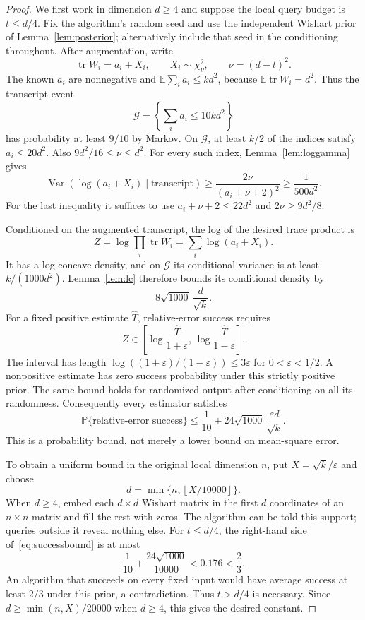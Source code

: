 \documentclass[11pt]{article}
\theoremstyle{definition}\newtheorem{definition}[theorem]{Definition}
\theoremstyle{remark}\newtheorem{remark}[theorem]{Remark}
\newcommand{\E}{\mathbb E}\newcommand{\PP}{\mathbb P}
\newcommand{\tr}{\operatorname{tr}}\newcommand{\rank}{\operatorname{rank}}
\newcommand{\Var}{\operatorname{Var}}\newcommand{\Cov}{\operatorname{Cov}}
\newcommand{\eps}{\varepsilon}\newcommand{\Qprod}{Q_{\mathrm{prod}}}
\newcommand{\floor}[1]{\left\lfloor#1\right\rfloor}
\begin{document}
\begin{proof}
We first work in dimension $d\ge4$ and suppose the local query budget is
$t\le d/4$. Fix the algorithm's random seed and use the independent Wishart
prior of Lemma~\ref{lem:posterior}; alternatively include that seed in the
conditioning throughout. After augmentation, write
\[
 \tr W_i=a_i+X_i,\qquad X_i\sim\chi^2_\nu,\qquad\nu=(d-t)^2.
\]
The known $a_i$ are nonnegative and $\E\sum_i a_i\le kd^2$, because
$\E\tr W_i=d^2$. Thus the transcript event
\[
 \mathcal G=\left\{\sum_i a_i\le10kd^2\right\}
\]
has probability at least $9/10$ by Markov. On $\mathcal G$, at least $k/2$ of
the indices satisfy $a_i\le20d^2$. Also
$9d^2/16\le\nu\le d^2$. For every such index,
Lemma~\ref{lem:loggamma} gives
\[
 \Var(\log(a_i+X_i)\mid\text{transcript})
 \ge\frac{2\nu}{(a_i+\nu+2)^2}\ge\frac1{500d^2}.
\]
For the last inequality it suffices to use
$a_i+\nu+2\le22d^2$ and $2\nu\ge9d^2/8$.

Conditioned on the augmented transcript, the log of the desired trace product is
\[
 Z=\log\prod_i\tr W_i=\sum_i\log(a_i+X_i).
\]
It has a log-concave density, and on $\mathcal G$ its conditional variance is at
least $k/(1000d^2)$. Lemma~\ref{lem:lc} therefore bounds its conditional density
by
\[
 8\sqrt{1000}\,\frac d{\sqrt k}.
\]
For a fixed positive estimate $\widehat T$, relative-error success requires
\[
 Z\in\left[\log\frac{\widehat T}{1+\eps},\,
             \log\frac{\widehat T}{1-\eps}\right].
\]
The interval has length
$\log((1+\eps)/(1-\eps))\le3\eps$ for $0<\eps<1/2$.
A nonpositive estimate has zero success probability under this strictly positive
prior. The same bound holds for randomized output after conditioning on all
its randomness. Consequently every estimator satisfies
\begin{equation}\label{eq:successbound}
 \PP\{\text{relative-error success}\}
 \le\frac1{10}+24\sqrt{1000}\,\frac{\eps d}{\sqrt k}.
\end{equation}
This is a probability bound, not merely a lower bound on mean-square error.

To obtain a uniform bound in the original local dimension $n$, put
$X=\sqrt k/\eps$ and choose
\[
 d=\min\{n,\floor{X/10000}\}.
\]
When $d\ge4$, embed each $d\times d$ Wishart matrix in the first $d$ coordinates
of an $n\times n$ matrix and fill the rest with zeros. The algorithm can be told
this support; queries outside it reveal nothing else. For $t\le d/4$, the
right-hand side of~\eqref{eq:successbound} is at most
\[
 \frac1{10}+\frac{24\sqrt{1000}}{10000}<0.176<\frac23.
\]
An algorithm that succeeds on every fixed input would have average success at
least $2/3$ under this prior, a contradiction. Thus $t>d/4$ is necessary.
Since $d\ge\min(n,X)/20000$ when $d\ge4$, this gives the desired constant.


\end{proof}
\end{document}
